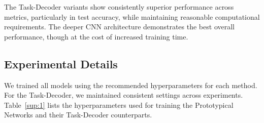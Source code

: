 



The Task-Decoder variants show consistently superior performance across metrics, particularly in test accuracy, while maintaining reasonable computational requirements. The deeper CNN architecture demonstrates the best overall performance, though at the cost of increased training time.

\subsection{Experimental Details}
\label{sec:exp_details}
We trained all models using the recommended hyperparameters for each method. For the Task-Decoder, we maintained consistent settings across experiments. Table~\ref{sup:1} lists the hyperparameters used for training the Prototypical Networks and their Task-Decoder counterparts.

